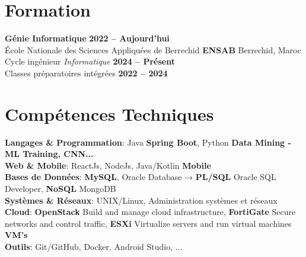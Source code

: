 \documentclass[A4,11pt]{article}
\begin{document}
\section{\faGraduationCap \hspace{0.2cm} Formation}
\begin{itemize}[leftmargin=0.4cm, label={}]
    \small{\item{
        \textbf{\color{accentcolor}Génie Informatique} \hfill \textbf{2022 -- Aujourd'hui} \\[1pt]
        \color{darkgray}École Nationale des Sciences Appliquées de Berrechid \textbf{ENSAB} \hfill \color{darkgray}Berrechid, Maroc \\[0pt]
        \color{darkgray}Cycle ingénieur \emph{\color{primarycolor}Informatique} \hfill \textbf{2024 -- Présent} \\[0pt]
        \color{darkgray}Classes préparatoires intégrées \hfill \textbf{2022 -- 2024}
    }}
\end{itemize}

\section{\faCogs \hspace{0.2cm} Compétences Techniques}
\begin{itemize}[leftmargin=0.4cm, label={}]
    \small{\item{
        \textbf{\color{primarycolor}Langages \& Programmation}{: \color{darkgray}Java \textbf{Spring Boot}, Python \textbf{Data Mining - ML Training, CNN...}} \\[1pt]
        \textbf{\color{primarycolor}Web \& Mobile}{: \color{darkgray}ReactJs, NodeJs, Java/Kotlin \textbf{Mobile}} \\[1pt]
        \textbf{\color{primarycolor}Bases de Données}{: \color{darkgray}\textbf{MySQL}, Oracle Database → \textbf{PL/SQL} Oracle SQL Developer, \textbf{NoSQL} MongoDB} \\[1pt]
        \textbf{\color{primarycolor}Systèmes \& Réseaux}{: \color{darkgray}UNIX/Linux, Administration systèmes et réseaux} \\[1pt]
        \textbf{\color{primarycolor}Cloud}{: \color{darkgray}\textbf{OpenStack} Build and manage cloud infrastructure, \textbf{FortiGate} Secure networks and control traffic, \textbf{ESXi} Virtualize servers and run virtual machines \textbf{VM's}} \\[1pt]
        \textbf{\color{primarycolor}Outils}{: \color{darkgray}Git/GitHub, Docker, Android Studio, ...}
    }}
\end{itemize}
\end{document}
